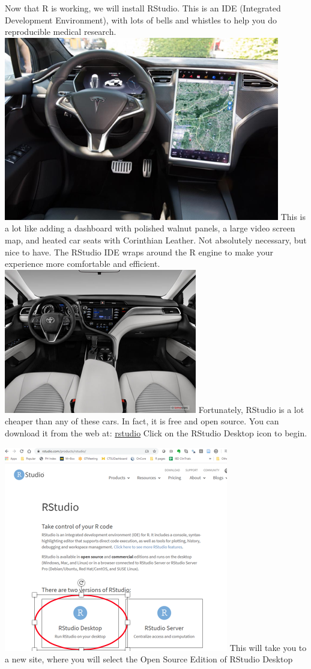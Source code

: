\documentclass[
]{book}
\begin{document}
Now that R is working, we will install RStudio. This is an IDE (Integrated Development Environment), with lots of bells and whistles to help you do reproducible medical research.
\includegraphics{images/teslax_dash.png}
This is a lot like adding a dashboard with polished walnut panels, a large video screen map, and heated car seats with Corinthian Leather. Not absolutely necessary, but nice to have.
The RStudio IDE wraps around the R engine to make your experience more comfortable and efficient.
\includegraphics{images/camry_dash.png}
Fortunately, RStudio is a lot cheaper than any of these cars. In fact, it is free and open source. You can download it from the web at:
\href{https://rstudio.com/products/rstudio/}{rstudio}
Click on the RStudio Desktop icon to begin.

\includegraphics{images/rstudio_download.png}
This will take you to a new site, where you will select the Open Source Edition of RStudio Desktop
\end{document}
